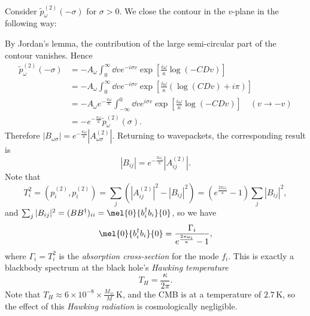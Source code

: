 \documentclass{jknotes}
\begin{document}
Consider \(\tilde{p}_\omega^{(2)}(-\sigma)\) for \(\sigma > 0\). We close the contour in the \(v\)-plane in the following way:
\begin{figure}[H]
    \centering
\end{figure}
By Jordan's lemma, the contribution of the large semi-circular part of the contour vanishes. Hence
\begin{align}
    \tilde{p}_\omega^{(2)}(-\sigma) &= -A_\omega\int_0^\infty \dd{v} e^{-i\sigma v}\exp\left[\frac{i\omega}{\kappa}\log(-CDv)\right] \\
                                    &= -A_\omega\int_0^\infty \dd{v} e^{-i\sigma v}\exp\left[\frac{i\omega}{\kappa}\left(\log(CDv)+i\pi\right)\right] \\
                                    &= -A_\omega e^{-\frac{\pi\omega}{\kappa}} \int^0_{-\infty} \dd{v} e^{i\sigma v} \exp\left[\frac{i\omega}{\kappa}\log(-CDv)\right] \quad (v\to-v) \\
                                    &= -e^{-\frac{\pi\omega}{\kappa}} \tilde{p}_\omega^{(2)}(\sigma).
\end{align}
Therefore \(|B_{\omega\sigma}| = e^{-\frac{\pi\omega}{\kappa}} |A^{(2)}_{\omega\sigma}|\). Returning to wavepackets, the corresponding result is
\begin{equation}
    |B_{ij}| = e^{-\frac{\pi\omega_i}{\kappa}} |A^{(2)}_{ij}|.
\end{equation}
Note that 
\begin{equation}
    T_i^2 = (p_i^{(2)},p_i^{(2)}) = \sum_j\left(|A^{(2)}_{ij}|^2 - |B_{ij}|^2\right) = \left(e^{\frac{2\pi\omega_i}{\kappa}}-1\right)\sum_j|B_{ij}|^2,
\end{equation}
and \(\sum_j|B_{ij}|^2=(BB^\dagger)_{ii}=\mel{0}{b_i^\dagger b_i}{0}\), so we have
\begin{equation}
    \mel{0}{b_i^\dagger b_i}{0} = \frac{\Gamma_i}{e^{\frac{2\pi\omega_i}{\kappa}}-1},
\end{equation}
where \(\Gamma_i=T_i^2\) is the \emph{absorption cross-section} for the mode \(f_i\). This is exactly a blackbody spectrum at the black hole's \emph{Hawking temperature}
\begin{equation}
    T_H = \frac{\kappa}{2\pi}.
\end{equation}
Note that \(T_H\approx 6\times10^{-8}\times\frac{M_{\astrosun}}{M}\,\text{K}\), and the CMB is at a temperature of \(2.7\,\text{K}\), so the effect of this \emph{Hawking radiation} is cosmologically negligible.
\end{document}
